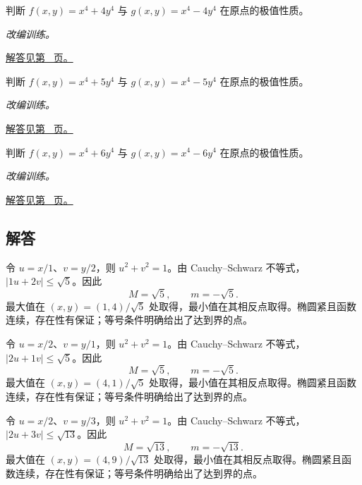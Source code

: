 \documentclass[12pt,fontset=fandol]{ctexart}
\begin{document}
\begin{example}\label{ex:c35q22}
判断 $f(x,y)=x^4+4y^4$ 与 $g(x,y)=x^4-4y^4$ 在原点的极值性质。
\par\textit{改编训练。}\par\hyperref[ans:c35q22]{解答见第~\pageref{ans:c35q22} 页。}
\end{example}
\begin{example}\label{ex:c35q23}
判断 $f(x,y)=x^4+5y^4$ 与 $g(x,y)=x^4-5y^4$ 在原点的极值性质。
\par\textit{改编训练。}\par\hyperref[ans:c35q23]{解答见第~\pageref{ans:c35q23} 页。}
\end{example}
\begin{example}\label{ex:c35q24}
判断 $f(x,y)=x^4+6y^4$ 与 $g(x,y)=x^4-6y^4$ 在原点的极值性质。
\par\textit{改编训练。}\par\hyperref[ans:c35q24]{解答见第~\pageref{ans:c35q24} 页。}
\end{example}
\subsection{解答}
\begin{solve}\label{ans:c35q1}
令 $u=x/1$、$v=y/2$，则 $u^2+v^2=1$。由 Cauchy--Schwarz 不等式，$|1u+2v|\le\sqrt{5}$。因此
\[
M=\sqrt{5},\qquad m=-\sqrt{5}.
\]
最大值在 $(x,y)=(1,4)/\sqrt{5}$ 处取得，最小值在其相反点取得。椭圆紧且函数连续，存在性有保证；等号条件明确给出了达到界的点。
\end{solve}

\begin{solve}\label{ans:c35q2}
令 $u=x/2$、$v=y/1$，则 $u^2+v^2=1$。由 Cauchy--Schwarz 不等式，$|2u+1v|\le\sqrt{5}$。因此
\[
M=\sqrt{5},\qquad m=-\sqrt{5}.
\]
最大值在 $(x,y)=(4,1)/\sqrt{5}$ 处取得，最小值在其相反点取得。椭圆紧且函数连续，存在性有保证；等号条件明确给出了达到界的点。
\end{solve}

\begin{solve}\label{ans:c35q3}
令 $u=x/2$、$v=y/3$，则 $u^2+v^2=1$。由 Cauchy--Schwarz 不等式，$|2u+3v|\le\sqrt{13}$。因此
\[
M=\sqrt{13},\qquad m=-\sqrt{13}.
\]
最大值在 $(x,y)=(4,9)/\sqrt{13}$ 处取得，最小值在其相反点取得。椭圆紧且函数连续，存在性有保证；等号条件明确给出了达到界的点。
\end{solve}
\end{document}
